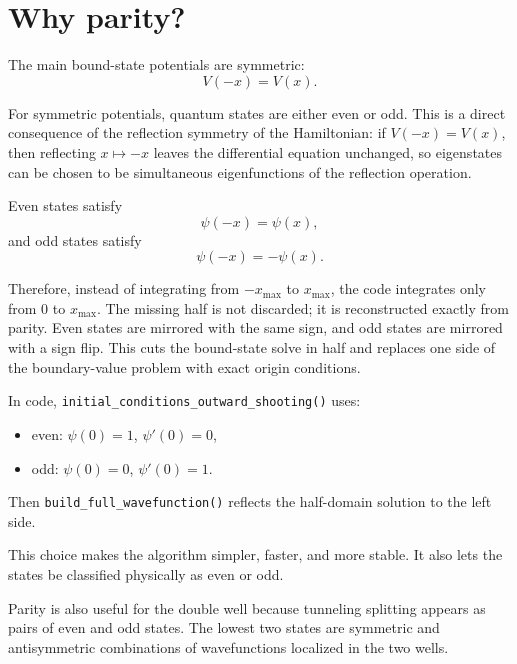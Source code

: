 \documentclass[11pt]{article}
\begin{document}
    \section{Why parity?}

    The main bound-state potentials are symmetric:
    \begin{equation}
        V(-x)=V(x).
    \end{equation}

    For symmetric potentials, quantum states are either even or odd. This is a
    direct consequence of the reflection symmetry of the Hamiltonian: if
    $V(-x)=V(x)$, then reflecting $x\mapsto -x$ leaves the differential
    equation unchanged, so eigenstates can be chosen to be simultaneous
    eigenfunctions of the reflection operation.

    Even states satisfy
    \begin{equation}
        \psi(-x)=\psi(x),
    \end{equation}
    and odd states satisfy
    \begin{equation}
        \psi(-x)=-\psi(x).
    \end{equation}

    Therefore, instead of integrating from $-x_{\max}$ to $x_{\max}$, the code
    integrates only from $0$ to $x_{\max}$. The missing half is not discarded;
    it is reconstructed exactly from parity. Even states are mirrored with the
    same sign, and odd states are mirrored with a sign flip. This cuts the
    bound-state solve in half and replaces one side of the boundary-value
    problem with exact origin conditions.

    In code, \texttt{initial\_conditions\_outward\_shooting()} uses:
    \begin{itemize}
        \item even: $\psi(0)=1$, $\psi'(0)=0$,
        \item odd: $\psi(0)=0$, $\psi'(0)=1$.
    \end{itemize}

    Then \texttt{build\_full\_wavefunction()} reflects the half-domain solution to the left side.

    This choice makes the algorithm simpler, faster, and more stable. It also lets the states be classified physically as even or odd.

    Parity is also useful for the double well because tunneling splitting appears as pairs of even and odd states. The lowest two states are symmetric and antisymmetric combinations of wavefunctions localized in the two wells.
\end{document}
